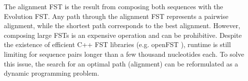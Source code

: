 The alignment FST is the result from composing both sequences with the Evolution
FST.
Any path through the alignment FST represents a pairwise alignment, while the
shortest path corresponds to the best alignment.
However, composing large FSTs is an expensive operation and can be prohibitive.
Despite the existence of efficient C++ FST libraries (e.g. openFST
\cite{allauzen2007openfst}), runtime is still limiting for sequence pairs longer
than a few thousand nucleotides each.
To solve this issue, the search for an optimal path (alignment) can be
reformulated as a dynamic programming problem.


